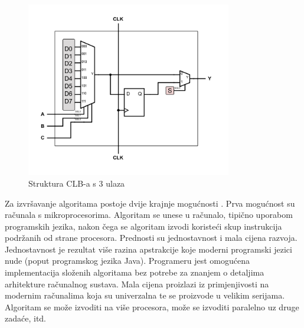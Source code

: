 \documentclass[times, utf8, diplomski]{fer}
\begin{document}
\begin{figure}[htb]
	\centering
	\includegraphics[width=0.8\textwidth]{img/CLB.png}
	\caption{Struktura CLB-a s $3$ ulaza}
	\label{fig:clb}
\end{figure}

Za izvršavanje algoritama postoje dvije krajnje mogućnosti \cite{article:reconfigurable}. Prva mogućnost su računala s mikroprocesorima. Algoritam se unese u računalo, tipično uporabom programskih jezika, nakon čega se algoritam izvodi koristeći skup instrukcija podržanih od strane procesora. Prednosti su jednostavnost i mala cijena razvoja. Jednostavnost je rezultat više razina apstrakcije koje moderni programski jezici nude (poput programskog jezika Java). Programeru jest omogućena implementacija složenih algoritama bez potrebe za znanjem o detaljima arhitekture računalnog sustava. Mala cijena proizlazi iz primjenjivosti na modernim računalima koja su univerzalna te se proizvode u velikim serijama. Algoritam se može izvoditi na više procesora, može se izvoditi paralelno uz druge zadaće, itd.
\end{document}
